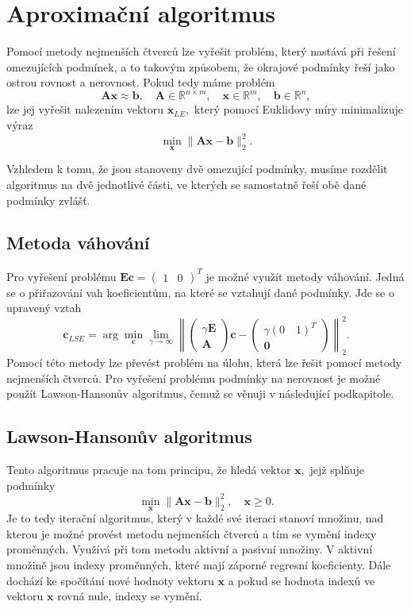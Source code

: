 \section{Aproximační algoritmus}
Pomocí metody nejmenších čtverc\r u \cite{bjork} lze vyřešit problém, který nastává při řešení omezujících podmínek, a to takovým zp\r usobem, že okrajové podmínky řeší jako ostrou rovnost a nerovnost.
Pokud tedy máme problém $$\mathbf{Ax}\approx\mathbf{b},\quad \mathbf{A}\in\mathbb{R}^{n\times m},
  \quad\mathbf{x}\in\mathbb{R}^{m},\quad\mathbf{b}\in\mathbb{R}^{n},$$
  lze jej vyřešit nalezením vektoru $\mathbf{x}_{LE},$ který pomocí Euklidovy míry minimalizuje výraz $$\min_{\mathbf{x}}\|\mathbf{Ax}-\mathbf{b}\|_2^2.$$
  
Vzhledem k tomu, že jsou stanoveny dvě omezující podmínky, musíme rozdělit algoritmus na dvě jednotlivé části, ve kterých se samostatně řeší obě dané podmínky zvláš\v t.

\subsection{Metoda váhování}
Pro vyřešení problému $\mathbf{Ec} = \begin{pmatrix} 1 & 0 \end{pmatrix}^T$ je možné využít metody váhování. Jedná se o přiřazování vah koeficient\r um, na které se vztahují dané podmínky. Jde se o upravený vztah \cite{bjork} $$\mathbf{c}_{LSE} = \arg\min_{\mathbf{c}}\lim_{\gamma\rightarrow\infty}\left\|\begin{pmatrix} \gamma\mathbf{E} \\ \mathbf{A} 
  \end{pmatrix}\mathbf{c} - \begin{pmatrix} \gamma (0\quad1)^T \\ \mathbf{0} \end{pmatrix}\right\|_2^2.$$
Pomocí této metody lze převést problém na \' ulohu, která lze řešit pomocí metody nejmenších čtverc\r u. Pro vyřešení problému podmínky na nerovnost je možné použít Lawson-Hanson\r uv algoritmus, čemuž se věnuji v následující podkapitole.
\subsection{Lawson-Hanson\r uv algoritmus}

Tento algoritmus \cite{chen} pracuje na tom principu, že hledá vektor $\mathbf{x},$ jejž spl\v nuje podmínky $$\min_{\mathbf{x}}\|\mathbf{Ax}-\mathbf{b}\|_2^2,\quad\mathbf{x} \geq 0.$$
Je to tedy iterační algoritmus, který v každé své iteraci stanoví množinu, nad kterou je možné provést metodu nejmenších čtverc\r u a tím se vymění indexy proměnných. Využívá při tom metodu aktivní a pasivní množiny. V aktivní množině jsou indexy proměnných, které mají záporné regresní koeficienty. Dále dochází ke spočítání nové hodnoty vektoru $\mathbf{x}$ a pokud se hodnota index\r u ve vektoru $\mathbf{x}$ rovná nule, indexy se vymění.


